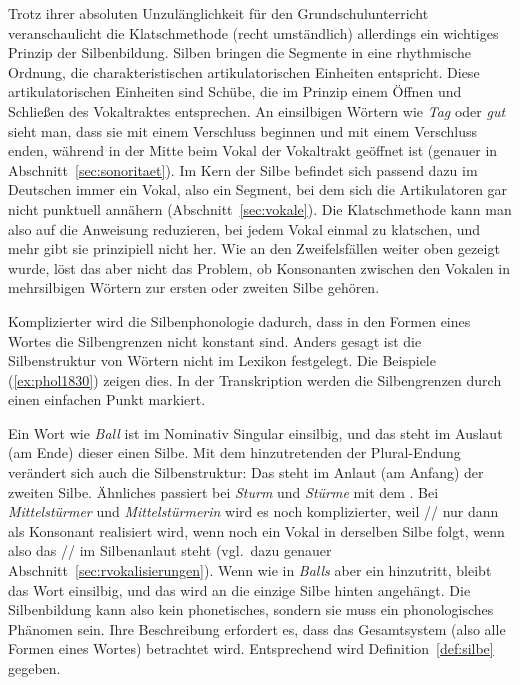 Trotz ihrer absoluten Unzulänglichkeit für den Grundschulunterricht veranschaulicht die Klatschmethode (recht umständlich) allerdings ein wichtiges Prinzip der Silbenbildung.
Silben bringen die Segmente in eine rhythmische Ordnung, die charakteristischen artikulatorischen Einheiten entspricht.
Diese artikulatorischen Einheiten sind Schübe, die im Prinzip einem Öffnen und Schließen des Vokaltraktes entsprechen.
An einsilbigen Wörtern wie \textit{Tag} \textipa{[ta:k]} oder \textit{gut} \textipa{[gu:t]} sieht man, dass sie mit einem Verschluss beginnen und mit einem Verschluss enden, während in der Mitte beim Vokal der Vokaltrakt geöffnet ist (genauer in Abschnitt~\ref{sec:sonoritaet}).
Im Kern der Silbe befindet sich passend dazu im Deutschen immer ein Vokal, also ein Segment, bei dem sich die Artikulatoren gar nicht punktuell annähern (Abschnitt~\ref{sec:vokale}).
Die Klatschmethode kann man also auf die Anweisung reduzieren, bei jedem Vokal einmal zu klatschen, und mehr gibt sie prinzipiell nicht her.
Wie an den Zweifelsfällen weiter oben gezeigt wurde, löst das aber nicht das Problem, ob Konsonanten zwischen den Vokalen in mehrsilbigen Wörtern zur ersten oder zweiten Silbe gehören.

Komplizierter wird die Silbenphonologie dadurch, dass in den Formen eines Wortes die Silbengrenzen nicht konstant sind.
Anders gesagt ist die Silbenstruktur von Wörtern nicht im Lexikon festgelegt.
Die Beispiele (\ref{ex:phol1830}) zeigen dies.
In der Transkription werden die Silbengrenzen durch einen einfachen Punkt markiert.

\begin{exe}
  \ex\label{ex:phol1830}
  \begin{xlist}
  \end{xlist}
\end{exe}

Ein Wort wie \textit{Ball} ist im Nominativ Singular einsilbig, und das \textipa{[l]} steht im Auslaut (am Ende) dieser einen Silbe.
Mit dem hinzutretenden \textipa{[@]} der Plural-Endung verändert sich auch die Silbenstruktur:
Das \textipa{[l]} steht im Anlaut (am Anfang) der zweiten Silbe.
Ähnliches passiert bei \textit{Sturm} und \textit{Stürme} mit dem \textipa{[m]}.
Bei \textit{Mittelstürmer} \textipa{[mI.t@l.St\t{Y@}.m5]} und \textit{Mittelstürmerin} \textipa{[mI.t@l.St\t{Y@}.m@.KIn]} wird es noch komplizierter, weil // nur dann als Konsonant \textipa{[K]} realisiert wird, wenn noch ein Vokal in derselben Silbe folgt, wenn also das // im Silbenanlaut steht (vgl.\ dazu genauer Abschnitt~\ref{sec:rvokalisierungen}).
Wenn wie in \textit{Balls} aber ein \textipa{[s]} hinzutritt, bleibt das Wort einsilbig, und das \textipa{[s]} wird an die einzige Silbe hinten angehängt.
Die Silbenbildung kann also kein phonetisches, sondern sie muss ein phonologisches Phänomen sein.
Ihre Beschreibung erfordert es, dass das Gesamtsystem (also \zB alle Formen eines Wortes) betrachtet wird.
Entsprechend wird Definition~\ref{def:silbe} gegeben.

